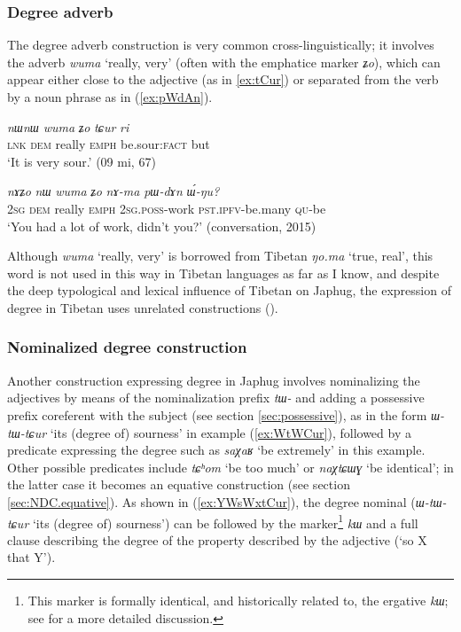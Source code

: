 \documentclass[oneside,a4paper,12pt]{article}
\newcommand{\ipa}[1]{{\phon\textit{#1}}}
\newcommand{\forme}[2]{\ipa{#1} `#2'}
\begin{document}
\subsubsection{Degree adverb} \label{sec:wuma}
The degree adverb construction is very common cross-linguistically; it involves the adverb \forme{wuma}{really, very} (often with the emphatice marker \ipa{ʑo}), which can appear either close to the adjective (as in \ref{ex:tCur}) or separated from the verb by a noun phrase as in (\ref{ex:pWdAn}).

\begin{exe}
\ex \label{ex:tCur}
\gll \ipa{tɕe} 	\ipa{nɯnɯ} 	\ipa{wuma} 	\ipa{ʑo} 	\ipa{tɕur} 	\ipa{ri} \\
\textsc{lnk} \textsc{dem} really  \textsc{emph} be.sour:\textsc{fact} but \\
\glt `It is very sour.' (09 mi, 67)
\end{exe}

\begin{exe}
\ex \label{ex:pWdAn}
\gll
\ipa{nɤʑo} 	\ipa{nɯ} 	\ipa{wuma} 	\ipa{ʑo} 	\ipa{nɤ-ma} 	\ipa{pɯ-dɤn} 	\ipa{ɯ́-ŋu?}  \\
\textsc{2sg} \textsc{dem} really \textsc{emph} \textsc{2sg.poss}-work \textsc{pst.ipfv}-be.many \textsc{qu}-be \\
\glt `You had a lot of work, didn't you?' (conversation, 2015)
\end{exe}

Although \forme{wuma}{really, very} is borrowed from Tibetan \ipa{ŋo.ma} `true, real', this word is not used in this way in Tibetan languages as far as I know, and despite the deep typological and lexical influence of Tibetan on Japhug, the expression of degree in Tibetan uses unrelated constructions (\citealt{simon15evaluative}).

\subsubsection{Nominalized degree construction} \label{sec:NDC}
Another construction expressing degree in Japhug involves nominalizing the adjectives by means of the nominalization prefix \ipa{tɯ-} and adding a possessive prefix coreferent with the subject (see section \ref{sec:possessive}), as in the form \forme{ɯ-tɯ-tɕur}{its (degree of) sourness} in example (\ref{ex:WtWCur}), followed by a predicate expressing the degree such as  \forme{saχaʁ}{be extremely} in this example. Other possible predicates include \forme{tɕʰom}{be too much} or \forme{naχtɕɯɣ}{be identical}; in the latter case it becomes an equative construction (see section \ref{sec:NDC.equative}).  As shown in (\ref{ex:YWsWxtCur}), the degree nominal (\ipa{ɯ-tɯ-tɕur} `its (degree of) sourness') can be followed by the marker\footnote{This marker is formally identical, and historically related to, the ergative \ipa{kɯ}; see \citet{jacques16comparative} for a more detailed discussion. } \ipa{kɯ} and a full clause describing the degree of the property described by the adjective (`so X that Y').
\end{document}
